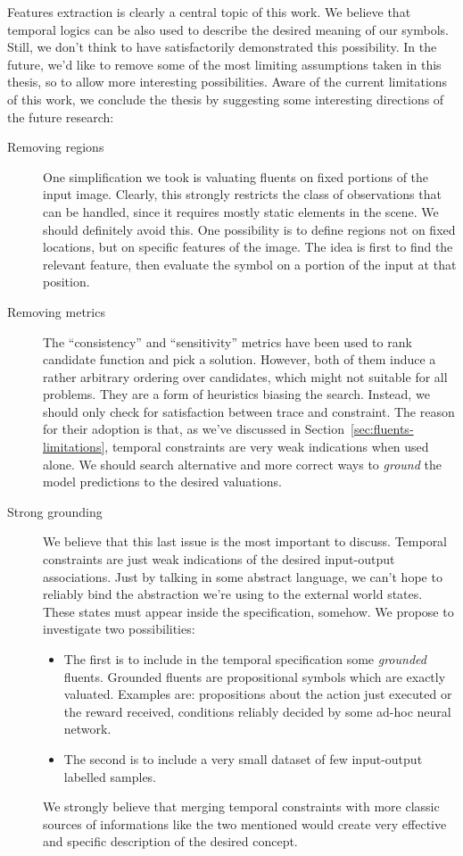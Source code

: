 Features extraction is clearly a central topic of this work. We believe that
temporal logics can be also used to describe the desired meaning of our
symbols. Still, we don't think to have satisfactorily demonstrated this
possibility. In the future, we'd like to remove some of the most limiting
assumptions taken in this thesis, so to allow more interesting possibilities.
Aware of the current limitations of this work, we conclude the thesis by
suggesting some interesting directions of the future research:
\begin{description}
	\item [Removing regions]
		One simplification we took is valuating fluents on fixed portions of the
		input image. Clearly, this strongly restricts the class of observations
		that can be handled, since it requires mostly static elements in the
		scene.  We should definitely avoid this. One possibility is to define
		regions not on fixed locations, but on specific features of the image. The
		idea is first to find the relevant feature, then evaluate the symbol on a
		portion of the input at that position.

	\item [Removing metrics]
		The ``consistency'' and ``sensitivity'' metrics have been used to rank
		candidate function and pick a solution. However, both of them induce a
		rather arbitrary ordering over candidates, which might not suitable for
		all problems. They are a form of heuristics biasing the search. Instead,
		we should only check for satisfaction between trace and constraint.
		The reason for their adoption is that, as we've discussed in
		Section~\ref{sec:fluents-limitations}, temporal constraints are very weak
		indications when used alone. We should search alternative and more correct
		ways to \emph{ground} the model predictions to the desired valuations.

	\item [Strong grounding]
		We believe that this last issue is the most important to discuss. Temporal
		constraints are just weak indications of the desired input-output
		associations. Just by talking in some abstract language, we can't hope to
		reliably bind the abstraction we're using to the external world states.
		These states must appear inside the specification, somehow. We propose to
		investigate two possibilities:
		\begin{itemize}
			\item The first is to include in the temporal specification some
				\emph{grounded} fluents. Grounded fluents are propositional symbols
				which are exactly valuated. Examples are: propositions about the
				action just executed or the reward received, conditions reliably
				decided by some ad-hoc neural network.
			\item The second is to include a very small dataset of few input-output
				labelled samples.
		\end{itemize}
		We strongly believe that merging temporal constraints with more classic
		sources of informations like the two mentioned would create very effective
		and specific description of the desired concept.


\end{description}
